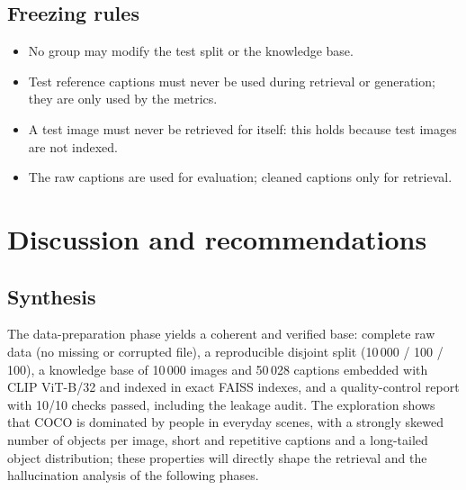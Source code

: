 \documentclass[11pt,a4paper]{article}
\renewcommand{\_}{\textunderscore\allowbreak{}}
\begin{document}
\subsection{Freezing rules}
\begin{itemize}[nosep]
  \item No group may modify the test split or the knowledge base.
  \item Test reference captions must never be used during retrieval or generation; they are only used by the metrics.
  \item A test image must never be retrieved for itself: this holds because test images are not indexed.
  \item The raw captions are used for evaluation; cleaned captions only for retrieval.
\end{itemize}


\section{Discussion and recommendations}
\label{sec:limits}

\subsection{Synthesis}
The data-preparation phase yields a coherent and verified base: complete raw data (no missing or corrupted file), a reproducible disjoint split (10\,000 / 100 / 100), a knowledge base of 10\,000 images and 50\,028 captions embedded with CLIP ViT-B/32 and indexed in exact FAISS indexes, and a quality-control report with 10/10 checks passed, including the leakage audit. The exploration shows that COCO is dominated by people in everyday scenes, with a strongly skewed number of objects per image, short and repetitive captions and a long-tailed object distribution; these properties will directly shape the retrieval and the hallucination analysis of the following phases.
\end{document}
